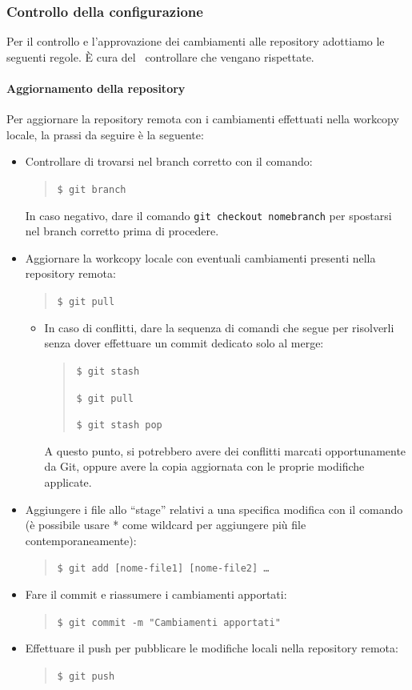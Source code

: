 		\subsubsection{Controllo della configurazione} \label{ControlloConfigurazione}
		Per il controllo e l'approvazione dei cambiamenti alle repository adottiamo le seguenti regole.
		È cura del \Ver\ controllare che vengano rispettate.

			\paragraph{Aggiornamento della repository}
			Per aggiornare la repository remota con i cambiamenti effettuati nella workcopy locale, la prassi da seguire è la seguente:
			\begin{itemize}
				\item Controllare di trovarsi nel branch corretto con il comando:
					\begin{quote}
						\texttt{\$\ git branch}
					\end{quote}
					In caso negativo, dare il comando \texttt{git checkout nomebranch} per spostarsi nel branch corretto prima di procedere.
				\item Aggiornare la workcopy locale con eventuali cambiamenti presenti nella repository remota:
					\begin{quote}
						\texttt{\$\ git pull}
					\end{quote}
				\begin{itemize}
					\item In caso di conflitti, dare la sequenza di comandi che segue per risolverli senza dover effettuare un commit
						dedicato solo al merge:
						\begin{quote}
							\texttt{\$\ git stash}\par
							\texttt{\$\ git pull}\par
							\texttt{\$\ git stash pop}\par
						\end{quote}
						A questo punto, si potrebbero avere dei conflitti marcati opportunamente da Git, oppure avere la copia aggiornata
						con le proprie modifiche applicate.
				\end{itemize}
				\item Aggiungere i file allo ``stage'' relativi a una specifica modifica con il comando (è possibile usare * come wildcard
					per aggiungere più file contemporaneamente):
					\begin{quote}
						\texttt{\$\ git add [nome-file1] [nome-file2] \dots}
					\end{quote}
				\item Fare il commit e riassumere i cambiamenti apportati:
				\begin{quote}
					\texttt{\$\ git commit -m "Cambiamenti apportati"}
				\end{quote}
				\item Effettuare il push per pubblicare le modifiche locali nella repository remota:
				\begin{quote}
					\texttt{\$\ git push}
				\end{quote}
			\end{itemize}

